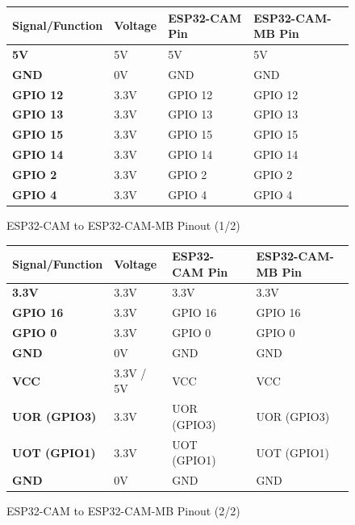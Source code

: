 \documentclass[12pt, a4paper]{report}
\begin{document}
\begin{figure}[H]
    \centering
    \renewcommand{\arraystretch}{1.3} %
    \caption{ESP32-CAM to ESP32-CAM-MB Pinout (1/2)}
    \label{fig:esp32_pinout_1_table} %
    \begin{tabularx}{\textwidth}{>{\bfseries}l X X X} %
        \toprule
        \textbf{Signal/Function} & \textbf{Voltage} & \textbf{ESP32-CAM Pin} & \textbf{ESP32-CAM-MB Pin} \\
        \midrule
        5V        & 5V            & 5V        & 5V \\
        GND       & 0V            & GND       & GND \\
        GPIO 12   & 3.3V          & GPIO 12   & GPIO 12 \\
        GPIO 13   & 3.3V          & GPIO 13   & GPIO 13 \\
        GPIO 15   & 3.3V          & GPIO 15   & GPIO 15 \\
        GPIO 14   & 3.3V          & GPIO 14   & GPIO 14 \\
        GPIO 2    & 3.3V          & GPIO 2    & GPIO 2 \\
        GPIO 4    & 3.3V          & GPIO 4    & GPIO 4 \\
        \bottomrule
    \end{tabularx}
\end{figure}

\begin{figure}[H]
    \centering
    \renewcommand{\arraystretch}{1.3} %
    \caption{ESP32-CAM to ESP32-CAM-MB Pinout (2/2)}
    \label{fig:esp32_pinout_2_table} %
    \begin{tabularx}{\textwidth}{>{\bfseries}l X X X}
        \toprule
        \textbf{Signal/Function} & \textbf{Voltage} & \textbf{ESP32-CAM Pin} & \textbf{ESP32-CAM-MB Pin} \\
        \midrule
        3.3V        & 3.3V          & 3.3V        & 3.3V \\
        GPIO 16     & 3.3V          & GPIO 16     & GPIO 16 \\
        GPIO 0      & 3.3V          & GPIO 0      & GPIO 0 \\
        GND         & 0V            & GND         & GND \\
        VCC         & 3.3V / 5V     & VCC         & VCC \\
        UOR (GPIO3) & 3.3V          & UOR (GPIO3) & UOR (GPIO3) \\
        UOT (GPIO1) & 3.3V          & UOT (GPIO1) & UOT (GPIO1) \\
        GND         & 0V            & GND         & GND \\
        \bottomrule
    \end{tabularx}
\end{figure}
\end{document}
